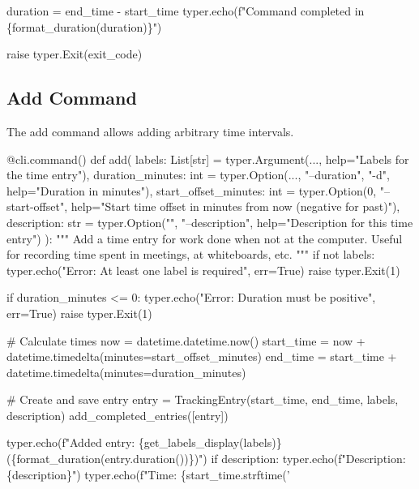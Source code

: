     duration = end_time - start_time
    typer.echo(f"Command completed in \{format_duration(duration)\}")
    
    raise typer.Exit(exit_code)
\nwendcode{}\nwdocspar

\subsection{Add Command}

The add command allows adding arbitrary time intervals.

\nwenddocs{}\endmoddef\nwstartdeflinemarkup{}\nwenddeflinemarkup
@cli.command()
def add(
    labels: List[str] = typer.Argument(..., help="Labels for the time entry"),
    duration_minutes: int = typer.Option(..., "--duration", "-d", help="Duration in minutes"),
    start_offset_minutes: int = typer.Option(0, "--start-offset", help="Start time offset in minutes from now (negative for past)"),
    description: str = typer.Option("", "--description", help="Description for this time entry")
):
    """
    Add a time entry for work done when not at the computer.
    Useful for recording time spent in meetings, at whiteboards, etc.
    """
    if not labels:
        typer.echo("Error: At least one label is required", err=True)
        raise typer.Exit(1)
    
    if duration_minutes <= 0:
        typer.echo("Error: Duration must be positive", err=True)
        raise typer.Exit(1)
    
    # Calculate times
    now = datetime.datetime.now()
    start_time = now + datetime.timedelta(minutes=start_offset_minutes)
    end_time = start_time + datetime.timedelta(minutes=duration_minutes)
    
    # Create and save entry
    entry = TrackingEntry(start_time, end_time, labels, description)
    add_completed_entries([entry])
    
    typer.echo(f"Added entry: \{get_labels_display(labels)\} (\{format_duration(entry.duration())\})")
    if description:
        typer.echo(f"Description: \{description\}")
    typer.echo(f"Time: \{start_time.strftime('%
\nwendcode{}\nwdocspar

